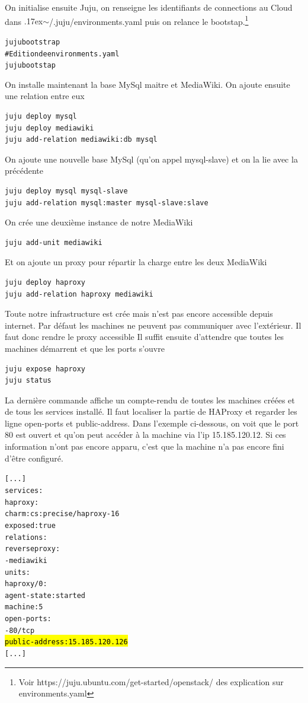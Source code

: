 \documentclass[a4paper,oneside]{report}
\begin{document}
On initialise ensuite Juju, on renseigne les identifiants de connections au Cloud dans {\raise.17ex\hbox{$\scriptstyle\sim$}}/.juju/environments.yaml puis on relance le bootstap.\footnote{Voir https://juju.ubuntu.com/get-started/openstack/ des explication sur environments.yaml}
\begin{alltt}
juju bootstrap
# Edition de environments.yaml
juju bootstap
\end{alltt}

On installe maintenant la base MySql maitre et MediaWiki. On ajoute ensuite une relation entre eux
\begin{verbatim}
juju deploy mysql
juju deploy mediawiki
juju add-relation mediawiki:db mysql
\end{verbatim}

On ajoute une nouvelle base MySql (qu'on appel mysql-slave) et on la lie avec la précédente
\begin{verbatim}
juju deploy mysql mysql-slave
juju add-relation mysql:master mysql-slave:slave
\end{verbatim}

On crée une deuxième instance de notre MediaWiki
\begin{verbatim}
juju add-unit mediawiki
\end{verbatim}


Et on ajoute un proxy pour répartir la charge entre les deux MediaWiki
\begin{verbatim}
juju deploy haproxy
juju add-relation haproxy mediawiki
\end{verbatim}

Toute notre infrastructure est crée mais n'est pas encore accessible depuis internet. 
Par défaut les machines ne peuvent pas communiquer avec l'extérieur. Il faut donc rendre le proxy accessible
Il suffit ensuite d'attendre que toutes les machines démarrent et que les ports s'ouvre
\begin{verbatim}
juju expose haproxy
juju status
\end{verbatim}

La dernière commande affiche un compte-rendu de toutes les machines créées et de tous les services installé. Il faut localiser la partie de HAProxy et regarder les ligne open-ports et public-address. Dans l'exemple ci-dessous, on voit que le port 80 est ouvert et qu'on peut accéder à la machine via l'ip 15.185.120.12. Si ces information n'ont pas encore apparu, c'est que la machine n'a pas encore fini d'être configuré. 
\begin{alltt}
[...]
services:
  haproxy:
    charm: cs:precise/haproxy-16
    exposed: true
    relations:
      reverseproxy:
      - mediawiki
    units:
      haproxy/0:
        agent-state: started
        machine: 5
        open-ports:
        - 80/tcp
        \hl{public-address: 15.185.120.126}
[...]
\end{alltt}
\end{document}
